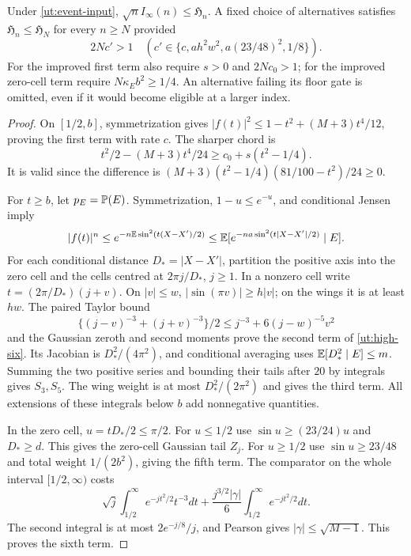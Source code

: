 \begin{lemma}\label{ut:high}
Under \eqref{ut:event-input}, $\sqrt n I_\infty(n)\le\mathfrak H_n$.
A fixed choice of alternatives satisfies
$\mathfrak H_n\le\mathfrak H_N$ for every $n\ge N$ provided
\begin{equation}\label{ut:high-gates}
 2Nc'>1\quad
 (c'\in\{c,ah^2w^2,a(23/48)^2,1/8\}).
\end{equation}
For the improved first term also require $s>0$ and $2Nc_0>1$;
for the improved zero-cell term require $N\kappa_Eb^2\ge1/4$.
An alternative failing its floor gate is omitted, even if it would
become eligible at a larger index.
\end{lemma}
\begin{proof}
On $[1/2,b]$, symmetrization gives
$|f(t)|^2\le1-t^2+(M+3)t^4/12$, proving the first term with rate
$c$. The sharper chord is
\[
 t^2/2-(M+3)t^4/24\ge c_0+s(t^2-1/4).
\]
It is valid since the difference is
$(M+3)(t^2-1/4)(81/100-t^2)/24\ge0$.

For $t\ge b$, let $p_E=\mathbb P(E)$. Symmetrization, $1-u\le e^{-u}$,
and conditional Jensen imply
\[
 |f(t)|^n\le e^{-n\mathbb E\sin^2(t(X-X')/2)}
 \le\mathbb E[e^{-na\sin^2(t|X-X'|/2)}\mid E].
\]
For each conditional distance $D_*=|X-X'|$, partition the positive
axis into the zero cell and the cells centred at
$2\pi j/D_*$, $j\ge1$. In a nonzero cell write
$t=(2\pi/D_*)(j+v)$. On $|v|\le w$,
$|\sin(\pi v)|\ge h|v|$; on the wings it is at least $hw$.
The paired Taylor bound
\[
 \{(j-v)^{-3}+(j+v)^{-3}\}/2
             \le j^{-3}+6(j-w)^{-5}v^2
\]
and the Gaussian zeroth and second moments prove the second term
of \eqref{ut:high-six}. Its Jacobian is
$D_*^2/(4\pi^2)$, and conditional averaging uses
$\mathbb E[D_*^2\mid E]\le m$. Summing the two positive series and
bounding their tails after $20$ by integrals gives $S_3,S_5$.
The wing weight is at most $D_*^2/(2\pi^2)$ and gives the third term.
All extensions of these integrals below $b$ add nonnegative quantities.

In the zero cell, $u=tD_*/2\le\pi/2$.
For $u\le1/2$ use $\sin u\ge(23/24)u$ and $D_*\ge d$.
This gives the zero-cell Gaussian tail $Z_j$.
For $u\ge1/2$ use $\sin u\ge23/48$ and total weight
$1/(2b^2)$, giving the fifth term.
The comparator on the whole interval $[1/2,\infty)$ costs
\[
 \sqrt j\int_{1/2}^\infty e^{-jt^2/2}t^{-3}dt
 +\frac{j^{3/2}|\gamma|}{6}\int_{1/2}^\infty e^{-jt^2/2}dt.
\]
The second integral is at most $2e^{-j/8}/j$, and Pearson gives
$|\gamma|\le\sqrt{M-1}$. This proves the sixth term.


\end{proof}
